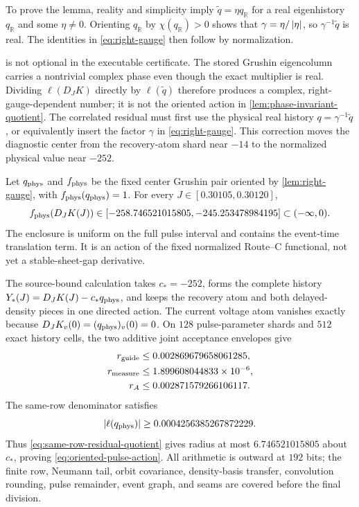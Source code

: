 To prove the lemma, reality and simplicity imply
\(\widetilde q=\eta q_{\mathbb R}\) for a real eigenhistory
\(q_{\mathbb R}\) and some \(\eta\ne0\).  Orienting
\(q_{\mathbb R}\) by \(\chi(q_{\mathbb R})>0\) shows that
\(\gamma=\eta/\left\lvert\eta\right\rvert\), so \(\gamma^{-1}\widetilde q\) is real.
The identities in \cref{eq:right-gauge} then follow by normalization.

 is not optional in the executable certificate.  The
stored Grushin eigencolumn carries a nontrivial complex phase even though
the exact multiplier is real.  Dividing \(\ell(D_JK)\) directly by
\(\ell(\widetilde q)\) therefore produces a complex, right-gauge-dependent
number; it is not the oriented action in
\cref{lem:phase-invariant-quotient}.  The correlated residual must first use
the physical real history \(q=\gamma^{-1}\widetilde q\), or equivalently
insert the factor \(\gamma\) in \cref{eq:right-gauge}.  This correction moves
the diagnostic center from the recovery-atom shard near \(-14\) to the
normalized physical value near \(-252\).

\begin{theorem}
\label{thm:oriented-pulse-action}
Let \(q_{\rm phys}\) and \(f_{\rm phys}\) be the fixed center Grushin pair
oriented by \cref{lem:right-gauge}, with
\(f_{\rm phys}(q_{\rm phys})=1\).  For every
\(J\in[0.30105,0.30120]\),
\begin{equation}
 f_{\rm phys}(D_JK(J))\in
 [-258.746521015805,-245.253478984195]\subset(-\infty,0).
 \label{eq:oriented-pulse-action}
\end{equation}
The enclosure is uniform on the full pulse interval and contains the
event-time translation term.  It is an action of the fixed normalized
Route--C functional, not yet a stable-sheet-gap derivative.
\end{theorem}

The source-bound calculation takes \(c_*=-252\), forms the complete history
\(Y_*(J)=D_JK(J)-c_*q_{\rm phys}\), and keeps the recovery atom and both
delayed-density pieces in one directed action.  The current voltage atom
vanishes exactly because \(D_JK_v(0)=(q_{\rm phys})_v(0)=0\).  On \(128\)
pulse-parameter shards and \(512\) exact history cells, the two additive
joint acceptance envelopes give
\begin{align}
 r_{\rm guide}&\le0.002869679658061285,\notag\\
 r_{\rm measure}&\le1.899608044833\times10^{-6},\notag\\
 r_A&\le0.002871579266106117.                         \label{eq:stage5e-budget}
\end{align}
The same-row denominator satisfies
\begin{equation}
 |\ell(q_{\rm phys})|\ge0.0004256385267872229.       \label{eq:stage5e-denominator}
\end{equation}
Thus \cref{eq:same-row-residual-quotient} gives radius at most
\(6.746521015805\) about \(c_*\), proving
\cref{eq:oriented-pulse-action}.  All arithmetic is outward at \(192\) bits;
the finite row, Neumann tail, orbit covariance, density-basis transfer,
convolution rounding, pulse remainder, event graph, and seams are covered
before the final division.

